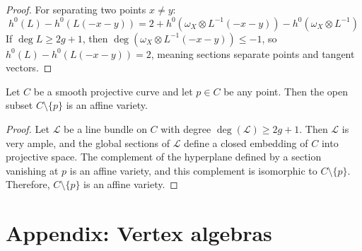 \documentclass[12pt]{article}
\begin{document}
\begin{proof}
    For separating two points $x\neq y$:
    \[
        h^0(L)-h^0(L(-x-y)) = 2 + h^0(\omega_X\otimes L^{-1}(-x-y)) - h^0(\omega_X\otimes L^{-1})
    \]
    If $\deg L\ge 2g+1$, then $\deg(\omega_X\otimes L^{-1}(-x-y))\le -1$, so $h^0(L) - h^0(L(-x-y))=2$, meaning sections separate points and tangent vectors.
\end{proof}

\begin{corollary}
    Let $C$ be a smooth projective curve and let $p \in C$ be any point. Then the open subset $C \setminus \{p\}$ is an affine variety.
\end{corollary}
\begin{proof}
    Let $\mathcal{L}$ be a line bundle on $C$ with degree $\deg(\mathcal{L}) \geq 2g+1$. Then $\mathcal{L}$ is very ample, and the global sections of $\mathcal{L}$ define a closed embedding of $C$ into projective space. The complement of the hyperplane defined by a section vanishing at $p$ is an affine variety, and this complement is isomorphic to $C \setminus \{p\}$. Therefore, $C \setminus \{p\}$ is an affine variety.
\end{proof}
\section{Appendix: Vertex algebras}
\end{document}
